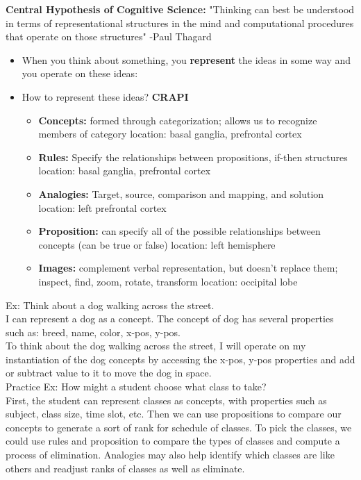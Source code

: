 \documentclass{article}
\begin{document}
\textbf{Central Hypothesis of Cognitive Science:} "Thinking can best be understood in terms of representational structures in the mind and computational procedures that operate on those structures" -Paul Thagard
\begin{itemize}
    \item When you think about something, you \textbf{represent} the ideas in some way and you operate on these ideas: 
    \item How to represent these ideas? \textbf{CRAPI}
    \begin{itemize}
        \item \textbf{Concepts:} formed through categorization; allows us to recognize members of category
            \subitem location: basal ganglia, prefrontal cortex
        \item \textbf{Rules:} Specify the relationships between propositions, if-then structures
            \subitem location: basal ganglia, prefrontal cortex
        \item \textbf{Analogies:} Target, source, comparison and mapping, and solution
            \subitem location: left prefrontal cortex
        \item \textbf{Proposition:} can specify all of the possible relationships between concepts (can be true or false)
            \subitem location: left hemisphere
        \item \textbf{Images:} complement verbal representation, but doesn't replace them; inspect, find, zoom, rotate, transform
            \subitem location: occipital lobe
    \end{itemize}
\end{itemize}

\noindent Ex: Think about a dog walking across the street. \\

I can represent a dog as a concept. The concept of dog has several properties such as: breed, name, color, x-pos, y-pos. \\

To think about the dog walking across the street, I will operate on my instantiation of the dog concepts by accessing the x-pos, y-pos properties and add or subtract value to it to move the dog in space. \\ 

\noindent Practice Ex: How might a student choose what class to take? \\ 

First, the student can represent classes as concepts, with properties such as subject, class size, time slot, etc. Then we can use propositions to compare our concepts to generate a sort of rank for schedule of classes. To pick the classes, we could use rules and proposition to compare the types of classes and compute a process of elimination. Analogies may also help identify which classes are like others and readjust ranks of classes as well as eliminate. 
\end{document}
